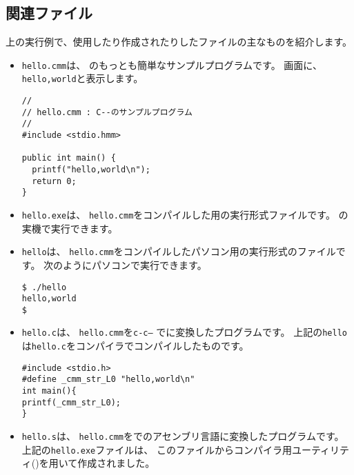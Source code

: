 \subsection{関連ファイル}

上の実行例で、使用したり作成されたりしたファイルの主なものを紹介します。

\begin{itemize}

\item {\tt hello.cmm}は、
\cmml のもっとも簡単なサンプルプログラムです。
画面に、\verb/hello,world/と表示します。

\begin{mylist}
\begin{verbatim}
//
// hello.cmm : C--のサンプルプログラム
//
#include <stdio.hmm>

public int main() {
  printf("hello,world\n");
  return 0;
}
\end{verbatim}
\end{mylist}

\item {\tt hello.exe}は、
\verb/hello.cmm/をコンパイルした\tacos 用の実行形式ファイルです。
\tac の実機で実行できます。

\item {\tt hello}は、
\verb/hello.cmm/をコンパイルしたパソコン用の実行形式のファイルです。
次のようにパソコンで実行できます。

\begin{mylist}
\begin{verbatim}
$ ./hello 
hello,world
$
\end{verbatim}
\end{mylist}

\item {\tt hello.c}は、
\verb/hello.cmm/を{\tt c-c--} で\cl に変換したプログラムです。
上記の{\tt hello}は{\tt hello.c}を\cl コンパイラでコンパイルしたものです。

\begin{mylist}
\begin{verbatim}
#include <stdio.h>
#define _cmm_str_L0 "hello,world\n"
int main(){
printf(_cmm_str_L0);
}
\end{verbatim}
\end{mylist}

\item {\tt hello.s}は、
\verb/hello.cmm/を\cmmc で\tac のアセンブリ言語に変換したプログラムです。
上記の{\tt hello.exe}ファイルは、
このファイルから\cmm コンパイラ用ユーティリティ(\util)を用いて作成されました。


\end{itemize}
